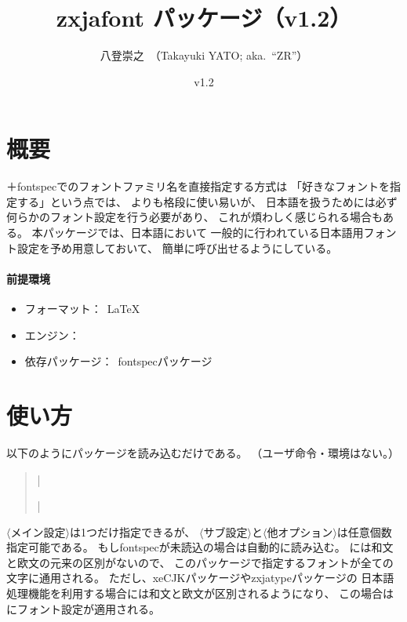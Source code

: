 \documentclass[xelatex,ja=standard,jafont=ipaex,
  a4paper]{bxjsarticle}
\newcommand{\PkgVersion}{1.2}
\newcommand{\PkgDate}{2020/02/24}
\newcommand{\Pkg}[1]{\textsf{#1}}
\newcommand{\Meta}[1]{$\langle$\mbox{}#1\mbox{}$\rangle$}
\newcommand{\Means}{：\ }
\newcommand{\JEmph}{\textgt}
\begin{document}
\title{\Pkg{zxjafont} パッケージ（v\PkgVersion）}
\author{八登崇之\ （Takayuki YATO; aka.~``ZR''）}
\date{v\PkgVersion\quad[\PkgDate]}
\maketitle

\section{概要}

{\XeLaTeX}＋\Pkg{fontspec}でのフォントファミリ名を直接指定する方式は
「好きなフォントを指定する」という点では、
{\pLaTeX}\>よりも格段に使い易いが、
日本語を扱うためには必ず何らかのフォント設定を行う必要があり、
これが煩わしく感じられる場合もある。
本パッケージでは、日本語\>{\LaTeX}\>において
一般的に行われている日本語用フォント設定を予め用意しておいて、
簡単に呼び出せるようにしている。

\paragraph{前提環境}\mbox{}
\begin{itemize}
\item フォーマット\Means {\LaTeX}
\item エンジン\Means {\XeTeX}
\item 依存パッケージ\Means \Pkg{fontspec}パッケージ
\end{itemize}

\section{使い方}
\label{sec:Usage}

以下のようにパッケージを読み込むだけである。
（ユーザ命令・環境はない。）
\begin{quote}\small
|\usepackage[|\Meta{メイン設定}|,|\Meta{サブ設定}|,|%
\Meta{他オプション}|]{zxjafont}|
\end{quote}

\Meta{メイン設定}は1つだけ指定できるが、
\Meta{サブ設定}と\Meta{他オプション}は任意個数指定可能である。
もし\Pkg{fontspec}が未読込の場合は自動的に読み込む。
{\XeLaTeX}\>には和文と欧文の元来の区別がないので、
このパッケージで指定するフォントが全ての文字に通用される。
ただし、\Pkg{xeCJK}パッケージや\Pkg{zxjatype}パッケージの
日本語処理機能を利用する場合には和文と欧文が区別されるようになり、
この場合は\JEmph{和文のみ}にフォント設定が適用される。
\end{document}
